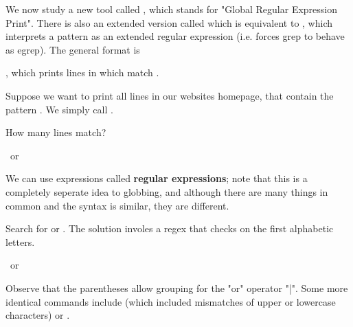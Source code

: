 \documentclass[english, 11pt]{article}
\begin{document}
   We now study a new tool called , which stands for "Global Regular Expression Print". There is also an extended version called  which is equivalent to , which interprets a pattern as an extended regular expression (i.e. forces grep to behave as egrep). The general format is
   \begin{center}
     , which prints lines in  which match .
   \end{center}
   \begin{exmp}
     Suppose we want to print all lines in our websites homepage,  that contain the pattern . We simply call .
   \end{exmp}
   How many lines match?
   \begin{center}
      \ or \ 
   \end{center}
   We can use expressions called \textbf{regular expressions}; note that this is a completely seperate idea to globbing, and although there are many things in common and the syntax is similar, they are different.
   \begin{exmp}
     Search for  or . The solution involes a regex that checks on the first alphabetic letters.
     \begin{center}
        \ or \ 
     \end{center}
     Observe that the parentheses allow grouping for the "or" operator "|". Some more identical commands include  (which included mismatches of upper or lowercase characters) or .
   \end{exmp}
\end{document}
